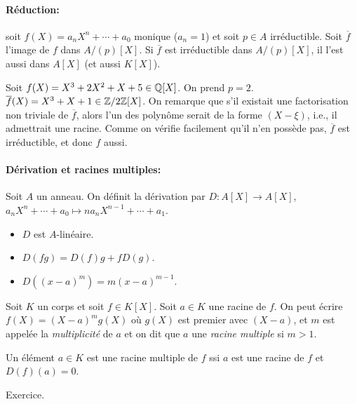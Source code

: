 \paragraph{Réduction:}

soit $f(X) = a_n X^n + \cdots + a_0$ monique ($a_n = 1$) et soit $p \in A$ irréductible. Soit $\overline{f}$
l'image de $f$ dans $A/(p)[X]$. Si $\overline{f}$ est irréductible dans $A/(p)[X]$, il l'est aussi dans $A[X]$
(et aussi $K[X]$).

\begin{ex}
  Soit $f(X) = X^3 + 2X^2 + X + 5 \in \mathbb{Q}[X]$. On prend $p = 2$. $\overline{f}(X) = X^3 + X + 1 \in
  \mathbb{Z}/2\mathbb{Z}[X]$. On remarque que s'il existait une factorisation non triviale de $\overline{f}$, alors l'un des
  polynôme serait de la forme $(X - \xi)$, i.e., il admettrait une racine. Comme on vérifie facilement qu'il
  n'en possède pas, $\overline{f}$ est irréductible, et donc $f$ aussi.
\end{ex}

\paragraph{Dérivation et racines multiples:}

Soit $A$ un anneau. On définit la dérivation par $D: A[X] \to A[X]$, $a_nX^n + \cdots + a_0 \mapsto
na_nX^{n-1} + \cdots + a_1$.
\begin{itemize}
\item $D$ est $A$-linéaire.
\item $D(fg) = D(f)g + fD(g)$.
\item $D((x-a)^m) = m(x-a)^{m-1}$.
\end{itemize}

\begin{defi}
  Soit $K$ un corps et soit $f \in K[X]$. Soit $a \in K$ une racine de $f$. On peut écrire $f(X) =
  (X-a)^{m}g(X)$ où $g(X)$ est premier avec $(X-a)$, et $m$ est appelée la \emph{multiplicité} de $a$ et on
  dit que $a$ une \emph{racine multiple} si $m > 1$.
\end{defi}

\begin{prop}
  Un élément $a \in K$ est une racine multiple de $f$ ssi $a$ est une racine de $f$ et $D(f)(a) = 0$.
\end{prop}

\begin{preuve}
  Exercice.
\end{preuve}



